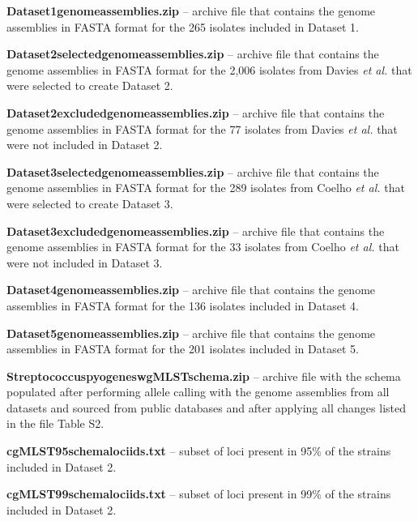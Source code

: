 \noindent \textbf{Dataset1\textunderscore genome\textunderscore assemblies.zip} – archive file that contains the genome assemblies in FASTA format for the 265 isolates included in Dataset 1.

\noindent \textbf{Dataset2\textunderscore selected\textunderscore genome\textunderscore assemblies.zip} – archive file that contains the genome assemblies in FASTA format for the 2,006 isolates from Davies \textit{et al.} \cite{davies_atlas_2019} that were selected to create Dataset 2.

\noindent \textbf{Dataset2\textunderscore excluded\textunderscore genome\textunderscore assemblies.zip} – archive file that contains the genome assemblies in FASTA format for the 77 isolates from Davies \textit{et al.} \cite{davies_atlas_2019} that were not included in Dataset 2.

\noindent \textbf{Dataset3\textunderscore selected\textunderscore genome\textunderscore assemblies.zip} – archive file that contains the genome assemblies in FASTA format for the 289 isolates from Coelho \textit{et al.} \cite{coelho_genomic_2019} that were selected to create Dataset 3.

\noindent \textbf{Dataset3\textunderscore excluded\textunderscore genome\textunderscore assemblies.zip} – archive file that contains the genome assemblies in FASTA format for the 33 isolates from Coelho \textit{et al.} \cite{coelho_genomic_2019} that were not included in Dataset 3.

\noindent \textbf{Dataset4\textunderscore genome\textunderscore assemblies.zip} – archive file that contains the genome assemblies in FASTA format for the 136 isolates included in Dataset 4.

\noindent \textbf{Dataset5\textunderscore genome\textunderscore assemblies.zip} – archive file that contains the genome assemblies in FASTA format for the 201 isolates included in Dataset 5.

\noindent \textbf{Streptococcus\textunderscore pyogenes\textunderscore wgMLST\textunderscore schema.zip} – archive file with the schema populated after performing allele calling with the genome assemblies from all datasets and sourced from public databases and after applying all changes listed in the file Table S2.

\noindent \textbf{cgMLST95\textunderscore schema\textunderscore loci\textunderscore ids.txt} – subset of loci present in 95\% of the strains included in Dataset 2.

\noindent \textbf{cgMLST99\textunderscore schema\textunderscore loci\textunderscore ids.txt} – subset of loci present in 99\% of the strains included in Dataset 2.

